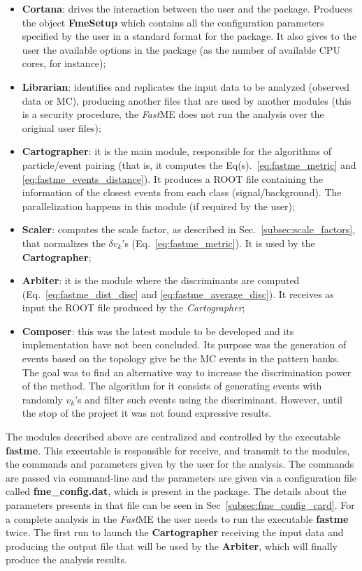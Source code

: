 \begin{itemize}
	\item \textbf{Cortana}: drives the interaction between the user and the package. Produces the object \textbf{FmeSetup} which contains all the configuration parameters specified by the user in a standard format for the package. It also gives to the user the available options in the package (as the number of available CPU cores, for instance);
	\item \textbf{Librarian}: identifies and replicates the input data to be analyzed (observed data or MC), producing another files that are used by another modules (this is a security procedure, the \textit{Fast}ME does not run the analysis over the original user files);
	\item \textbf{Cartographer}: it is the main module, responsible for the algorithms of particle/event pairing (that is, it computes the Eq(s).~\ref{eq:fastme_metric} and \ref{eq:fastme_events_distance}). It produces a ROOT file containing the information of the closest events from each class (signal/background). The parallelization happens in this module (if required by the user);
	\item \textbf{Scaler}: computes the scale factor, as described in Sec.~\ref{subsec:scale_factors}, that normalizes the $\delta v_{k}$'s (Eq.~\ref{eq:fastme_metric}). It is used by the \textbf{Cartographer};
	\item \textbf{Arbiter}: it is the module where the discriminants are computed (Eq.~\ref{eq:fastme_dist_disc} and \ref{eq:fastme_average_disc}). It receives as input the ROOT file produced by the \textit{Cartographer};
	\item \textbf{Composer}: this was the latest module to be developed and its implementation have not been concluded. Its purpose was the generation of events based on the topology give be the MC events in the pattern banks. The goal was to find an alternative way to increase the discrimination power of the method. The algorithm for it consists of generating events with randomly $v_{k}$'s and filter such events using the discriminant. However, until the stop of the project it was not found expressive results.
\end{itemize}

The modules described above are centralized and controlled by the executable \textbf{fastme}. This executable is responsible for receive, and transmit to the modules, the commands and parameters given by the user for the analysis. The commands are passed via command-line and the parameters are given via a configuration file called \textbf{fme\_config.dat}, which is present in the package. The details about the parameters presents in that file can be seen in Sec~\ref{subsec:fme_config_card}. For a complete analysis in the \textit{Fast}ME the user needs to run the executable \textbf{fastme} twice. The first run to launch the \textbf{Cartographer} receiving the input data and producing the output file that will be used by the \textbf{Arbiter}, which will finally produce the analysis results.


